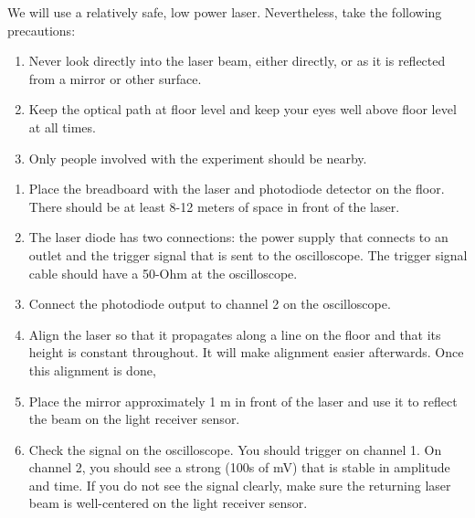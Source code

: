 \documentclass[11pt]{article}
\begin{document}
\vspace{5mm}


We will use a relatively safe, low power laser. Nevertheless, take the following
precautions:

\begin{enumerate}

\item Never look directly into the laser beam, either directly, or as it is
reflected from a mirror or other surface.

\item Keep the optical path at floor level and keep your eyes well above floor
level at all times.

\item Only people involved with the experiment should be nearby.

\end{enumerate}

\vspace{5mm}


\begin{enumerate}
  
\item Place the breadboard with the laser and photodiode detector on the floor.
There should be at least 8-12 meters of space in front of the laser.

\item The laser diode has two connections: the power supply that connects to an
outlet and the trigger signal that is sent to the oscilloscope. The trigger
signal cable should have a 50-Ohm at the oscilloscope.

\item Connect the photodiode output to channel 2 on the oscilloscope.
  
\item Align the laser so that it propagates along a line on the floor and that
its height is constant throughout. It will make alignment easier afterwards.
Once this alignment is done,

\item Place the mirror approximately 1 m in front of the laser and use it to
reflect the beam on the light receiver sensor.

\item Check the signal on the oscilloscope. You should trigger on channel 1.
On channel 2, you should see a strong (100s of mV) that is stable in amplitude
and time. If you do not see the signal clearly, make sure the returning laser beam 
is well-centered on the light receiver sensor.
  
\end{enumerate}
\end{document}
